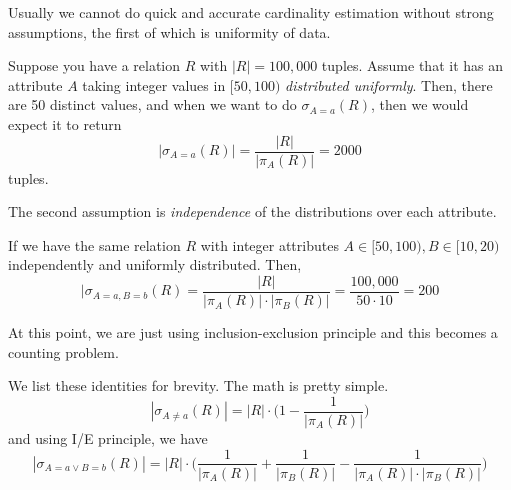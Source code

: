     Usually we cannot do quick and accurate cardinality estimation without strong assumptions, the first of which is uniformity of data. 

    \begin{example}
      \label{ex:selection-with-equality-predicates}
      Suppose you have a relation $R$ with $|R| = 100,000$ tuples. Assume that it has an attribute $A$ taking integer values in $[50, 100)$ \textit{distributed uniformly}. Then, there are 50 distinct values, and when we want to do $\sigma_{A = a} (R)$, then we would expect it to return 
      \begin{equation}
        |\sigma_{A = a} (R)| = \frac{|R|}{|\pi_A(R)|} = 2000
      \end{equation}
      tuples.
    \end{example}

    The second assumption is \textit{independence} of the distributions over each attribute. 

    \begin{example}
      \label{ex:selection-with-conjunctive-predicates}
      If we have the same relation $R$ with integer attributes $A \in [50, 100), B \in [10, 20)$ independently and uniformly distributed. Then, 
      \begin{equation}
        |\sigma_{A = a, B = b} (R) = \frac{|R|}{|\pi_A (R)| \cdot |\pi_B(R)|} = \frac{100,000}{50 \cdot 10} = 200
      \end{equation}
    \end{example}

    At this point, we are just using inclusion-exclusion principle and this becomes a counting problem. 

    \begin{example}
      \label{ex:negated-disjunctive-predicates}
      We list these identities for brevity. The math is pretty simple. 
      \begin{equation}
        |\sigma_{A \neq a} (R)| = |R| \cdot \bigg( 1 - \frac{1}{|\pi_A (R)|} \bigg)
      \end{equation}
      and using I/E principle, we have 
      \begin{equation}
        |\sigma_{A = a \lor B = b} (R)| = |R| \cdot \bigg( \frac{1}{|\pi_A (R)|}  + \frac{1}{|\pi_B (R)|} - \frac{1}{|\pi_A (R)| \cdot |\pi_B(R)|} \bigg)
      \end{equation}
    \end{example}

